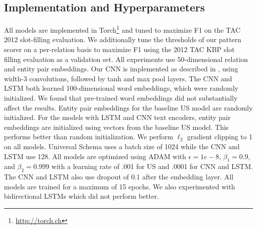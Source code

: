 \subsection {Implementation and Hyperparameters}
\label{sec:details}
All models are implemented in Torch\footnote{\url{http://torch.ch}} and tuned to maximize F1 on the TAC 2012 slot-filling evaluation. We additionally tune the thresholds of our pattern scorer on a per-relation basis to maximize F1 using the 2012 TAC KBP slot filling evaluation as a validation set. All experiments use 50-dimensional relation and entity pair embeddings. Our CNN is implemented as described in \cite{toutanova2015representing}, using width-3 convolutions, followed by tanh and max pool layers. The CNN and LSTM both learned 100-dimensional word embeddings, which were randomly initialized. We found that pre-trained word embeddings did not substantially affect the results. Entity pair embeddings for the baseline US model are randomly initialized. For the models with LSTM and CNN text encoders, entity pair embeddings are initialized using vectors from the baseline US model. This performs better than random initialization. We perform $\ell_2$ gradient clipping to 1 on all models. Universal Schema uses a batch size of 1024 while the CNN and LSTM use 128. All models are optimized using ADAM \citep{kingma2014adam} with $\epsilon=1e-8$, $\beta_1=0.9$, and $\beta_2=0.999$ with a learning rate of .001 for US and .0001 for CNN and LSTM. The CNN and LSTM also use dropout of 0.1 after the embedding layer. All models are trained for a maximum of 15 epochs. We also experimented with bidirectional LSTMs which did not perform better.
